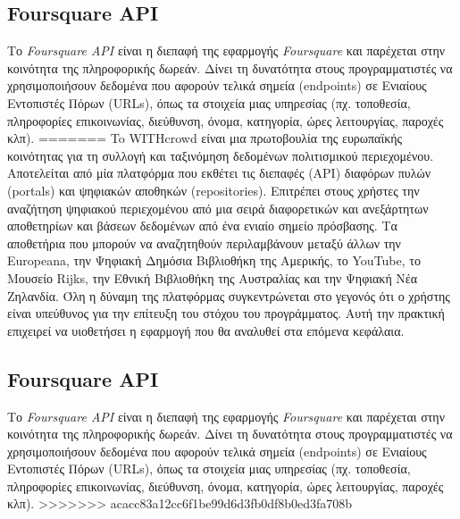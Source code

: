 \subsection{Foursquare API}
Το \textit{Foursquare API} \cite{[4SQ+18]} είναι η διεπαφή της εφαρμογής \textit{Foursquare} και παρέχεται στην κοινότητα της πληροφορικής δωρεάν. Δίνει τη δυνατότητα στους προγραμματιστές να χρησιμοποιήσουν δεδομένα που αφορούν τελικά σημεία (endpoints) σε Ενιαίους Εντοπιστές Πόρων (URLs), όπως τα στοιχεία μιας υπηρεσίας (πχ. τοποθεσία, πληροφορίες επικοινωνίας, διεύθυνση, όνομα, κατηγορία, ώρες λειτουργίας, παροχές κλπ).
=======
To WITHcrowd\cite{[WIT+18]} είναι μια πρωτοβουλία της ευρωπαϊκής κοινότητας για τη συλλογή και ταξινόμηση δεδομένων πολιτισμικού περιεχομένου. Αποτελείται από μία πλατφόρμα που εκθέτει τις διεπαφές (ΑΡΙ) διαφόρων πυλών (portals) και ψηφιακών αποθηκών (repositories). Eπιτρέπει στους χρήστες την αναζήτηση ψηφιακού περιεχομένου από μια σειρά διαφορετικών και ανεξάρτητων αποθετηρίων και βάσεων δεδομένων από ένα ενιαίο σημείο πρόσβασης. Τα αποθετήρια που μπορούν να αναζητηθούν περιλαμβάνουν μεταξύ άλλων την Europeana, την Ψηφιακή Δημόσια Βιβλιοθήκη της Αμερικής, το YouTube, το Μουσείο Rijks, την Εθνική Βιβλιοθήκη της Αυστραλίας και την Ψηφιακή Νέα Ζηλανδία. Όλη η δύναμη της πλατφόρμας συγκεντρώνεται στο γεγονός ότι ο χρήστης είναι υπεύθυνος για την επίτευξη του στόχου του προγράμματος. Αυτή την πρακτική επιχειρεί να υιοθετήσει η εφαρμογή που θα αναλυθεί στα επόμενα κεφάλαια. 

\subsection{Foursquare API}
Το \textit{Foursquare API}\cite{[4SQ+18]} είναι η διεπαφή της εφαρμογής \textit{Foursquare} και παρέχεται στην κοινότητα της πληροφορικής δωρεάν. Δίνει τη δυνατότητα στους προγραμματιστές να χρησιμοποιήσουν δεδομένα που αφορούν τελικά σημεία (endpoints) σε Ενιαίους Εντοπιστές Πόρων (URLs), όπως τα στοιχεία μιας υπηρεσίας (πχ. τοποθεσία, πληροφορίες επικοινωνίας, διεύθυνση, όνομα, κατηγορία, ώρες λειτουργίας, παροχές κλπ).
>>>>>>> acacc83a12cc6f1be99d6d3fb0df8b0ed3fa708b

